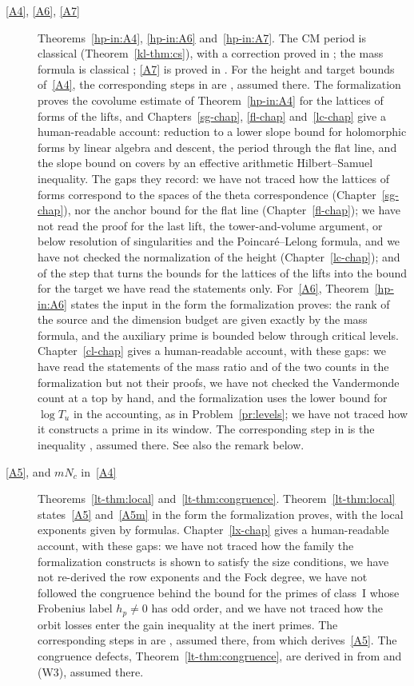 \documentclass[reqno]{amsart}
\newcounter{chap}
\theoremstyle{definition}
\theoremstyle{plain}
\begin{document}
{\begin{description}
\item[\eqref{A4}, \eqref{A6}, \eqref{A7}] Theorems~\ref{hp-in:A4}, \ref{hp-in:A6} and~\ref{hp-in:A7}.  The CM period is classical \cite{CS} (Theorem~\ref{kl-thm:cs}), with a correction proved in \cite[Props.~15.3 and~15.6]{Adr}; the mass formula is classical \cite{GHY}; \eqref{A7} is proved in \cite[Thm.~15.33]{Adr}.  For the height and target bounds of~\eqref{A4}, the corresponding steps in \cite{Adr} are \cite[Hyps.~15.10--15.12, 15.16 and~15.18]{Adr}, assumed there.  The formalization proves the covolume estimate of Theorem~\ref{hp-in:A4} for the lattices of forms of the lifts, and Chapters~\ref{sg-chap}, \ref{fl-chap} and~\ref{lc-chap} give a human-readable account: reduction to a lower slope bound for holomorphic forms by linear algebra and descent, the period through the flat line, and the slope bound on covers by an effective arithmetic Hilbert--Samuel inequality.  The gaps they record: we have not traced how the lattices of forms correspond to the spaces of the theta correspondence (Chapter~\ref{sg-chap}), nor the anchor bound for the flat line (Chapter~\ref{fl-chap}); we have not read the proof for the last lift, the tower-and-volume argument, or below resolution of singularities and the Poincar\'e--Lelong formula, and we have not checked the normalization of the height (Chapter~\ref{lc-chap}); and of the step that turns the bounds for the lattices of the lifts into the bound for the target we have read the statements only.  For~\eqref{A6}, Theorem~\ref{hp-in:A6} states the input in the form the formalization proves: the rank of the source and the dimension budget are given exactly by the mass formula, and the auxiliary prime is bounded below through critical levels.  Chapter~\ref{cl-chap} gives a human-readable account, with these gaps: we have read the statements of the mass ratio and of the two counts in the formalization but not their proofs, we have not checked the Vandermonde count at a top by hand, and the formalization uses the lower bound for \(\log T_u\) in the accounting, as in Problem~\ref{pr:levels}; we have not traced how it constructs a prime in its window.  The corresponding step in \cite{Adr} is the inequality \cite[Hyp.~15.23]{Adr}, assumed there.  See also the remark below.
\item[\eqref{A5}, and \(mN_c\) in~\eqref{A4}] Theorems~\ref{lt-thm:local} and~\ref{lt-thm:congruence}.  Theorem~\ref{lt-thm:local} states~\eqref{A5} and~\eqref{A5m} in the form the formalization proves, with the local exponents given by formulas.  Chapter~\ref{lx-chap} gives a human-readable account, with these gaps: we have not traced how the family the formalization constructs is shown to satisfy the size conditions, we have not re-derived the row exponents and the Fock degree, we have not followed the congruence behind the bound for the primes of class~I whose Frobenius label \(h_p \ne 0\) has odd order, and we have not traced how the orbit losses enter the gain inequality at the inert primes.  The corresponding steps in \cite{Adr} are \cite[Hyps.~16.13 and~16.14]{Adr}, assumed there, from which \cite[Thm.~16.6]{Adr} derives~\eqref{A5}.  The congruence defects, Theorem~\ref{lt-thm:congruence}, are derived in \cite[Thm.~17.37]{Adr} from \cite[Hyps.~17.24 and~17.36]{Adr} and (W3), assumed there.

\end{description}}
\end{document}
